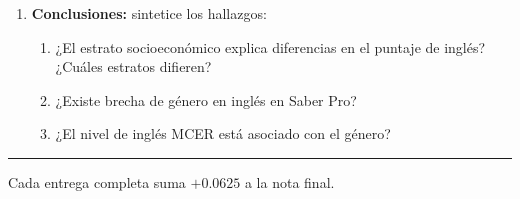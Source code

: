 \documentclass[11pt, a4paper]{article}
\begin{document}
\begin{enumerate}[label=\arabic*)]
  \item \textbf{Conclusiones:} sintetice los hallazgos:
        \begin{enumerate}[label=\alph*)]
          \item ¿El estrato socioecon\'omico explica diferencias en el puntaje
                de ingl\'es? ¿Cu\'ales estratos difieren?
          \item ¿Existe brecha de g\'enero en ingl\'es en Saber Pro?
          \item ¿El nivel de ingl\'es MCER est\'a asociado con el g\'enero?
        \end{enumerate}
\end{enumerate}

\vspace{10pt}
\rule{\linewidth}{0.4pt}
\begin{center}
{\small Cada entrega completa suma $+0.0625$ a la nota final.}
\end{center}
\end{document}
